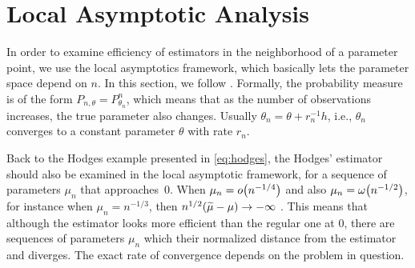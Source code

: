\documentclass[ejs, twoside]{imsart}
\theoremstyle{plain}
\theoremstyle{remark}
\newcommand{\iid}{i.i.d.}
\newcommand{\asymleq}[1]{o\left( #1 \right)}
\newcommand{\asymgtr}[1]{\omega\left( #1 \right)}
\numberwithin{equation}{section}
\numberwithin{table}{section}
\numberwithin{figure}{section}
\let\originalleft\left
\let\originalright\right
\renewcommand{\left}{\mathopen{}\mathclose\bgroup\originalleft}
\renewcommand{\right}{\aftergroup\egroup\originalright}
\begin{document}

\section{Local Asymptotic Analysis} \label{sec:la}

\label{sec:la-localparam}

In order to examine efficiency of estimators in the neighborhood of a parameter point, we use the local asymptotics framework, which basically lets the parameter space depend on $n$. In this section, we follow \citet[Chapters 7, 9, and 15]{van_der_vaart_asymptotic_1998}. Formally, the probability measure is of the form \(P_{n,\theta} = P_{\theta_n}^n\), which means that as the number of observations increases, the true parameter also changes. Usually \(\theta_n = \theta + r_n^{-1}h\), i.e., \(\theta_n\) converges to a constant parameter \(\theta\) with rate \(r_n\).




Back to the Hodges example presented in \eqref{eq:hodges}, the Hodges' estimator should also be examined in the local asymptotic framework, for a sequence of parameters \(\mu_n\) that approaches~\(0\). When \(\mu_n = \asymleq{n^{-1/4}}\) and also \(\mu_n = \asymgtr{n^{-1/2}}\), for instance when \(\mu_n = n^{-1/3}\), then \(n^{1/2}\left(\widetilde{\mu} - \mu \right) \to -\infty \) \citep[Example~8.1]{van_der_vaart_asymptotic_1998}. This means that although the estimator looks more efficient than the regular one at \(0\), there are sequences of parameters \(\mu_n\) which their normalized distance from the estimator and diverges. The exact rate of convergence depends on the problem in question.
\end{document}
